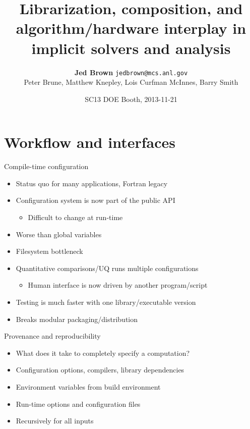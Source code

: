 \documentclass{beamer}
\title{Librarization, composition, and algorithm/hardware interplay in implicit solvers and analysis}
\author{{\bf Jed Brown} \texttt{jedbrown@mcs.anl.gov} \\
   Peter Brune,
   Matthew Knepley,
   Lois Curfman McInnes,
   Barry Smith}
\institute
{
  Mathematics and Computer Science Division \\ Argonne National Laboratory
}
\date{SC13 DOE Booth, 2013-11-21}
\begin{document}
\lstset{language=C}
\normalem

\begin{frame}
  \titlepage
\end{frame}

\section{Workflow and interfaces}
\begin{frame}{Compile-time configuration}
  \begin{itemize}
  \item Status quo for many applications, Fortran legacy
  \item Configuration system is now part of the public API
    \begin{itemize}
    \item Difficult to change at run-time
    \end{itemize}
  \item Worse than global variables
  \item Filesystem bottleneck
  \item Quantitative comparisons/UQ runs multiple configurations
    \begin{itemize}
    \item Human interface is now driven by another program/script
    \end{itemize}
  \item Testing is much faster with one library/executable version
  \item Breaks modular packaging/distribution
  \end{itemize}
\end{frame}
\begin{frame}{Provenance and reproducibility}
  \begin{itemize}
  \item What does it take to completely specify a computation?
  \item Configuration options, compilers, library dependencies
  \item Environment variables from build environment
  \item Run-time options and configuration files
  \item Recursively for all inputs
  \end{itemize}
\end{frame}
\end{document}
